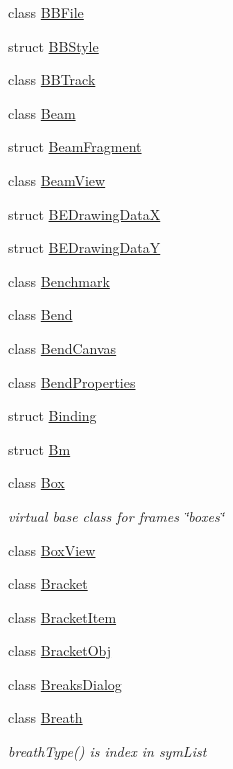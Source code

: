 \begin{DoxyCompactItemize}
\item 
class \hyperlink{class_ms_1_1_b_b_file}{B\+B\+File}
\item 
struct \hyperlink{struct_ms_1_1_b_b_style}{B\+B\+Style}
\item 
class \hyperlink{class_ms_1_1_b_b_track}{B\+B\+Track}
\item 
class \hyperlink{class_ms_1_1_beam}{Beam}
\item 
struct \hyperlink{struct_ms_1_1_beam_fragment}{Beam\+Fragment}
\item 
class \hyperlink{class_ms_1_1_beam_view}{Beam\+View}
\item 
struct \hyperlink{struct_ms_1_1_b_e_drawing_data_x}{B\+E\+Drawing\+DataX}
\item 
struct \hyperlink{struct_ms_1_1_b_e_drawing_data_y}{B\+E\+Drawing\+DataY}
\item 
class \hyperlink{class_ms_1_1_benchmark}{Benchmark}
\item 
class \hyperlink{class_ms_1_1_bend}{Bend}
\item 
class \hyperlink{class_ms_1_1_bend_canvas}{Bend\+Canvas}
\item 
class \hyperlink{class_ms_1_1_bend_properties}{Bend\+Properties}
\item 
struct \hyperlink{struct_ms_1_1_binding}{Binding}
\item 
struct \hyperlink{struct_ms_1_1_bm}{Bm}
\item 
class \hyperlink{class_ms_1_1_box}{Box}
\begin{DoxyCompactList}\small\item\em virtual base class for frames \char`\"{}boxes\char`\"{} \end{DoxyCompactList}\item 
class \hyperlink{class_ms_1_1_box_view}{Box\+View}
\item 
class \hyperlink{class_ms_1_1_bracket}{Bracket}
\item 
class \hyperlink{class_ms_1_1_bracket_item}{Bracket\+Item}
\item 
class \hyperlink{class_ms_1_1_bracket_obj}{Bracket\+Obj}
\item 
class \hyperlink{class_ms_1_1_breaks_dialog}{Breaks\+Dialog}
\item 
class \hyperlink{class_ms_1_1_breath}{Breath}
\begin{DoxyCompactList}\small\item\em breath\+Type() is index in sym\+List \end{DoxyCompactList}\item 

\end{DoxyCompactItemize}
